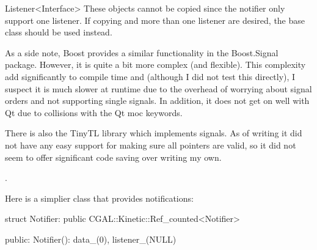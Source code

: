 \begin{ccRefClass}{Listener<Interface>}
These objects cannot be copied since the notifier only support one
listener. If copying and more than one listener are desired, the
 base class should be used instead.

As a side note, Boost provides a similar functionality in the Boost.Signal
package. However, it is quite a bit more complex (and flexible). This
complexity add significantly to compile time and (although I did not
test this directly), I suspect it is much slower at runtime due to the
overhead of worrying about signal orders and not supporting single
signals. In addition, it does not get on well with Qt due to
collisions with the Qt moc keywords.

There is also the TinyTL library which implements signals. As of
writing it did not have any easy support for making sure all pointers
are valid, so it did not seem to offer significant code saving over
writing my own.


\ccTypes



\ccCreation
{}  %


\ccOperations



\ccSeeAlso

.

\ccExample

Here is a simplier class that provides notifications:
\begin{ccExampleCode}
struct Notifier: public CGAL::Kinetic::Ref_counted<Notifier>
{
public:
  Notifier(): data_(0), listener_(NULL){}

}
\end{ccExampleCode}
\end{ccRefClass}
